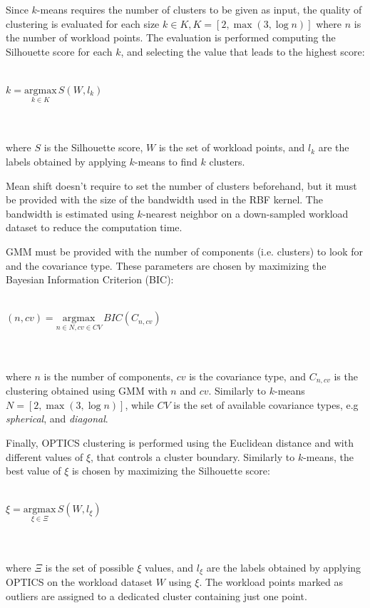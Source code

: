 \documentclass[a4paper]{article} %
\begin{document}
	Since $k$-means requires the number of clusters to be given as input, the quality of clustering is evaluated for each size $k \in K, K = [2, \max (3, \log n)]$ where $n$ is the number of workload points. The evaluation is performed computing the Silhouette score for each $k$, and selecting the value that leads to the highest score:\\\\
	\centerline{
	$
		k = \underset{k \in K}{\mathrm{argmax}}\, S(W, l_k)
	$
	}\\\\
	where $S$ is the Silhouette score, $W$ is the set of workload points, and $l_k$ are the labels obtained by applying $k$-means to find $k$ clusters.
	
	Mean shift doesn't require to set the number of clusters beforehand, but it must be provided with the size of the bandwidth used in the RBF kernel. The bandwidth is estimated using $k$-nearest neighbor on a down-sampled workload dataset to reduce the computation time.
	
	GMM must be provided with the number of components (i.e. clusters) to look for and the covariance type. These parameters are chosen by maximizing the Bayesian Information Criterion (BIC):\\\\
	\centerline{
		$
		(n, cv) = \underset{n \in N, cv \in CV}{\mathrm{argmax}}\, BIC(C_{n, cv})
		$
	}\\\\
	where $n$ is the number of components, $cv$ is the covariance type, and $C_{n, cv}$ is the clustering obtained using GMM with $n$ and $cv$. Similarly to $k$-means $N = [2, \max (3, \log n)]$, while $CV$ is the set of available covariance types, e.g \textit{spherical}, and \textit{diagonal}.
	
	Finally, OPTICS clustering is performed using the Euclidean distance and with different values of $\xi$, that controls a cluster boundary. Similarly to $k$-means, the best value of $\xi$ is chosen by maximizing the Silhouette score: \\\\
	\centerline{
		$
		\xi = \underset{\xi \in \Xi}{\mathrm{argmax}}\, S(W, l_\xi)
		$
	}\\\\
	where $\Xi$ is the set of possible $\xi$ values, and $l_\xi$ are the labels obtained by applying OPTICS on the workload dataset $W$ using $\xi$. The workload points marked as outliers are assigned to a dedicated cluster containing just one point.
	
\end{document}
